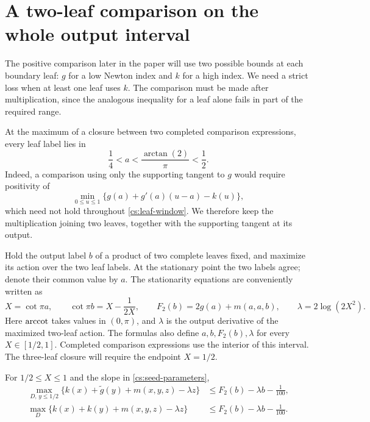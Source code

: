 \section{A two-leaf comparison on the whole output interval}\label{cs:two-leaf}

The positive comparison later in the paper will use two possible
bounds at each boundary leaf: $g$ for a low Newton index and $k$ for a
high index. We need a strict loss when at least one leaf uses $k$.
The comparison must be made after multiplication, since the analogous
inequality for a leaf alone fails in part of the required range.

At the maximum of a closure between two completed comparison
expressions, every leaf label lies in
\begin{equation}\label{cs:leaf-window}
 \frac14<a<\frac{\arctan(2)}{\pi}<\frac12.
\end{equation}
Indeed, a comparison using only the supporting tangent to $g$ would require positivity of
\[
 \min_{0\le u\le1}\{g(a)+g'(a)(u-a)-k(u)\},
\]
which need not hold throughout \eqref{cs:leaf-window}. We therefore keep the multiplication joining two leaves, together with the supporting tangent at its output.

Hold the output label $b$ of a product of two complete leaves fixed,
and maximize its action over the two leaf labels. At the stationary
point the two labels agree; denote their common value by $a$. The
stationarity equations are conveniently written as
\begin{equation}\label{cs:seed-parameters}
 X=\cot\pi a,\qquad \cot\pi b=X-\frac1{2X},\qquad
 F_2(b)=2g(a)+m(a,a,b),\qquad
 \lambda=2\log(2X^2).
\end{equation}
Here $\operatorname{arccot}$ takes values in $(0,\pi)$, and $\lambda$ is the
output derivative of the maximized two-leaf action. The formulas
also define $a,b,F_2(b),\lambda$ for every $X\in[1/2,1]$. Completed
comparison expressions use the interior of this interval. The
three-leaf closure will require the endpoint $X=1/2$.

\begin{lemma}\label{cs:two-leaf-gap}
For $1/2\le X\le1$ and the slope in \eqref{cs:seed-parameters},
\begin{align}
 \max_{D,\,y\le1/2}
 \{k(x)+\widetilde g(y)+m(x,y,z)-\lambda z\}
 &\le F_2(b)-\lambda b-\frac1{100},\label{cs:AC}\\
 \max_D\{k(x)+k(y)+m(x,y,z)-\lambda z\}
 &\le F_2(b)-\lambda b-\frac1{100}.\label{cs:AA}
\end{align}
\end{lemma}

